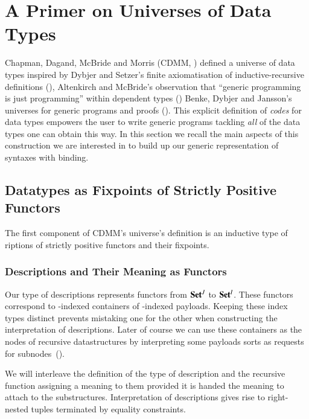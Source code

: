 \chapter{A Primer on Universes of Data Types}\label{section:data}

Chapman, Dagand, McBride and Morris
(CDMM, \citeyear{Chapman:2010:GAL:1863543.1863547})
defined a universe of data types inspired by Dybjer and Setzer's
finite axiomatisation of inductive-recursive definitions (\citeyear{Dybjer1999}),
Altenkirch and McBride's observation that ``generic programming is just
programming'' within dependent types
(\citeyear{DBLP:conf/ifip2-1/AltenkirchM02})
Benke, Dybjer and Jansson's universes for generic programs and proofs
(\citeyear{benke-ugpp}).
%
This explicit definition of \emph{codes} for data types empowers the
user to write generic programs tackling \emph{all} of the data types
one can obtain this way. In this section we recall the main aspects
of this construction we are interested in to build up our generic
representation of syntaxes with binding.

\section{Datatypes as Fixpoints of Strictly Positive Functors}

The first component of CDMM's universe's definition is an inductive
type of riptions of strictly positive functors and their
fixpoints.

\subsection{Descriptions and Their Meaning as Functors}
\label{fig:datades}
\label{fig:datadescmeaning}

Our type of descriptions represents functors from ${\mathbf{Set}}{}^J$ to ${\mathbf{Set}}{}^I$.
These functors correspond to -indexed containers of -indexed
payloads. Keeping these index types distinct prevents mistaking one for the
other when constructing the interpretation of descriptions. Later of course
we can use these containers as the nodes of recursive datastructures by
interpreting some payloads sorts as requests for
subnodes~(\cite{DBLP:journals/jfp/AltenkirchGHMM15}).

We will interleave the definition of the type of description and the
recursive function  assigning a meaning to them provided it
is handed the meaning to attach to the substructures. Interpretation
of descriptions gives rise to right-nested tuples terminated by equality
constraints.

